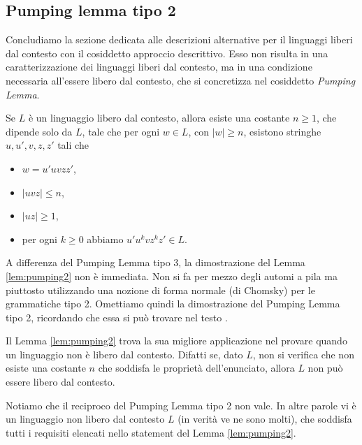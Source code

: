\documentclass[runningheads,a4paper]{llncs}
\begin{document}
\subsection{Pumping lemma tipo 2}

Concludiamo la sezione dedicata alle descrizioni alternative per il linguaggi liberi dal contesto con il cosiddetto approccio descrittivo. Esso non risulta in una caratterizzazione dei linguaggi liberi dal contesto, ma in una condizione necessaria all'essere libero dal contesto, che si concretizza nel cosiddetto \emph{Pumping Lemma}. 

\begin{lemma}\label{lem:pumping2}
Se $L$ \`{e} un linguaggio libero dal contesto, allora esiste una costante $n \geq 1$, che dipende solo da $L$, tale che per ogni $w \in L$, con $|w| \geq n$, esistono stringhe $u,u',v,z,z'$ tali che 
\begin{itemize}
  \item $w = u'uvzz'$,
  \item $|uvz| \leq n$,
  \item $|uz| \geq 1$,
  \item per ogni $k \geq 0$ abbiamo $u'u^kvz^kz' \in L$.
\end{itemize}
\end{lemma}

A differenza del Pumping Lemma tipo 3, la dimostrazione del Lemma \ref{lem:pumping2} non \`{e} immediata. Non si fa per mezzo degli automi a pila ma piuttosto utilizzando una nozione di forma normale (di Chomsky) per le grammatiche tipo 2. Omettiamo quindi la dimostrazione del Pumping Lemma tipo 2, ricordando che essa si pu\`{o} trovare nel testo \cite{HMU}.

Il Lemma \ref{lem:pumping2} trova la sua migliore applicazione nel provare quando un linguaggio non \`{e} libero dal contesto. Difatti se, dato $L$, non si verifica che non esiste una costante $n$ che soddisfa le propriet\`{a} dell'enunciato, allora $L$ non pu\`{o} essere libero dal contesto.

\begin{remark}
Notiamo che il reciproco del Pumping Lemma tipo 2 non vale. In altre parole vi \`{e} un linguaggio non libero dal contesto $L$ (in verit\`{a} ve ne sono molti), che soddisfa tutti i requisiti elencati nello statement del Lemma \ref{lem:pumping2}.
\end{remark}
\end{document}
